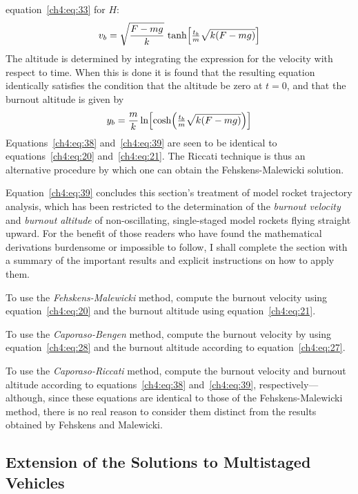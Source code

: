 equation~\eqref{ch4:eq:33} for $H$:
\begin{equation}\label{ch4:eq:38}
v_b = \sqrt{\frac{F - mg}{k}}\,\tanh\Bigl[\tfrac{t_b}{m}\sqrt{k(F - mg)}\Bigr]
\end{equation}
The altitude is determined by integrating the expression for the velocity with respect to time.
When this is done it is found that the resulting equation identically satisfies the condition that
the altitude be zero at $t = 0$, and that the burnout altitude is given by
\begin{equation}\label{ch4:eq:39}
y_b = \frac{m}{k}\ln\Bigl[\cosh\Bigl(\tfrac{t_b}{m}\sqrt{k(F - mg)}\Bigr)\Bigr]
\end{equation}
Equations~\eqref{ch4:eq:38} and~\eqref{ch4:eq:39} are seen to be identical to
equations~\eqref{ch4:eq:20} and~\eqref{ch4:eq:21}. The Riccati technique is thus an alternative
procedure by which one can obtain the Fehskens-Malewicki solution.

Equation~\eqref{ch4:eq:39} concludes this section's treatment of model rocket trajectory analysis,
which has been restricted to the determination of the \emph{burnout velocity} and \emph{burnout
altitude} of non-oscillating, single-staged model rockets flying straight upward. For the benefit of
those readers who have found the mathematical derivations burdensome or impossible to follow, I
shall complete the section with a summary of the important results and explicit instructions on
how to apply them.

To use the \emph{Fehskens-Malewicki} method, compute the burnout velocity using
equation~\eqref{ch4:eq:20} and the burnout altitude using equation~\eqref{ch4:eq:21}.

To use the \emph{Caporaso-Bengen} method, compute the burnout velocity by using
equation~\eqref{ch4:eq:28} and the burnout altitude according to equation~\eqref{ch4:eq:27}.

To use the \emph{Caporaso-Riccati} method, compute the burnout velocity and burnout altitude
according to equations~\eqref{ch4:eq:38} and~\eqref{ch4:eq:39}, respectively---although, since
these equations are identical to those of the Fehskens-Malewicki method, there is no real reason to
consider them distinct from the results obtained by Fehskens and Malewicki.

\subsection{Extension of the Solutions to Multistaged Vehicles}\label{ch4:sec:2.2}

